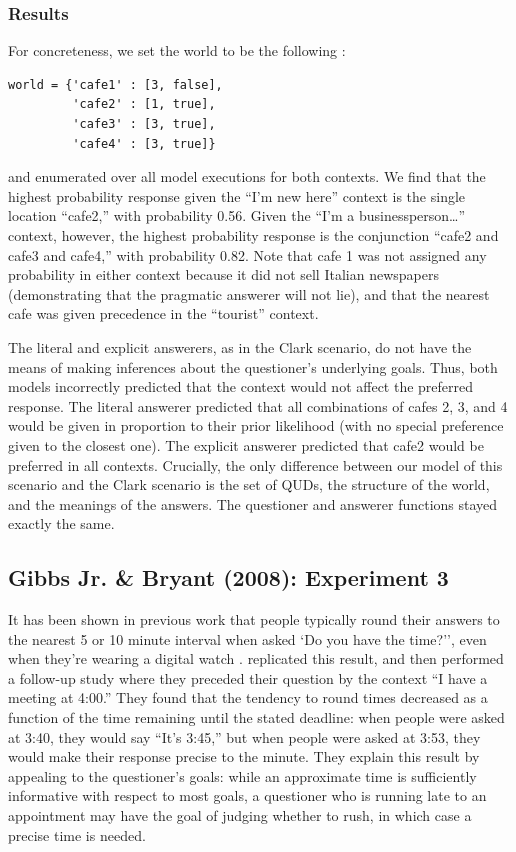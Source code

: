 \documentclass[12pt, floatsintext, jou]{apa6}
\begin{document}
\subsubsection{Results}

For concreteness, we set the world to be the following :

\begin{lstlisting}
world = {'cafe1' : [3, false],
         'cafe2' : [1, true],
         'cafe3' : [3, true],
         'cafe4' : [3, true]}
\end{lstlisting}
and enumerated over all model executions for both contexts. We find that the highest probability response given the ``I'm new here'' context is the single location ``cafe2,'' with probability 0.56. Given the ``I'm a businessperson\dots'' context, however, the highest probability response is the conjunction ``cafe2 and cafe3 and cafe4,'' with probability 0.82. Note that cafe 1 was not assigned any probability in either context because it did not sell Italian newspapers (demonstrating that the pragmatic answerer will not lie), and that the nearest cafe was given precedence in the ``tourist'' context. 

The literal and explicit answerers, as in the Clark scenario, do not have the means of making inferences about the questioner's underlying goals. Thus, both models incorrectly predicted that the context would not affect the preferred response. The literal answerer predicted that all combinations of cafes 2, 3, and 4 would be given in proportion to their prior likelihood (with no special preference given to the closest one). The explicit answerer predicted that cafe2 would be preferred in all contexts.     Crucially, the only difference between our model of this scenario and the Clark scenario is the set of QUDs, the structure of the world, and the meanings of the answers. The questioner and answerer functions stayed exactly the same.

\subsection{Gibbs Jr. \& Bryant (2008): Experiment 3}

It has been shown in previous work that people typically round their answers to the nearest 5 or 10 minute interval when asked `Do you have the time?'', even when they're wearing a digital watch \cite{DerHenstCarlesSperber02_RelevanceTellingTime}.   replicated this result, and then performed a follow-up study where they preceded their question by the context ``I have a meeting at 4:00.'' They found that the tendency to round times decreased as a function of the time remaining until the stated deadline: when people were asked at 3:40, they would say ``It's 3:45,'' but when people were asked at 3:53, they would make their response precise to the minute. They explain this result by appealing to the questioner's goals: while an approximate time is sufficiently informative with respect to most goals, a questioner who is running late to an appointment may have the goal of judging whether to rush, in which case a precise time is needed. 
\end{document}
